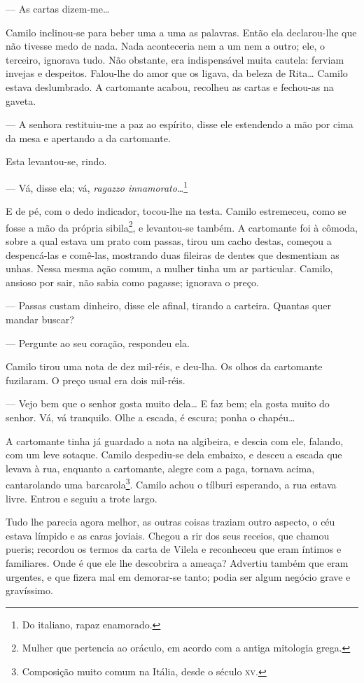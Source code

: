 --- As cartas dizem-me\ldots{}

Camilo inclinou-se para beber uma a uma as palavras. Então ela
declarou-lhe que não tivesse medo de nada. Nada aconteceria nem a um nem
a outro; ele, o terceiro, ignorava tudo. Não obstante, era indispensável
muita cautela: ferviam invejas e despeitos. Falou-lhe do amor que os
ligava, da beleza de Rita\ldots{} Camilo estava deslumbrado. A
cartomante acabou, recolheu as cartas e fechou-as na gaveta.

--- A senhora restituiu-me a paz ao espírito, disse ele estendendo a mão
por cima da mesa e apertando a da cartomante.

Esta levantou-se, rindo.

--- Vá, disse ela; vá, \emph{ragazzo innamorato}\ldots{}\footnote{Do
  italiano, rapaz enamorado.}

E de pé, com o dedo indicador, tocou-lhe na testa. Camilo
estremeceu, como se fosse a mão da própria sibila\footnote{Mulher que
  pertencia ao oráculo, em acordo com a antiga mitologia grega.}, e
levantou-se também. A cartomante foi à cômoda, sobre a qual estava um
prato com passas, tirou um cacho destas, começou a despencá-las e
comê-las, mostrando duas fileiras de dentes que desmentiam as unhas.
Nessa mesma ação comum, a mulher tinha um ar particular. Camilo, ansioso
por sair, não sabia como pagasse; ignorava o preço.

--- Passas custam dinheiro, disse ele afinal, tirando a carteira. Quantas
quer mandar buscar?

--- Pergunte ao seu coração, respondeu ela.

Camilo tirou uma nota de dez mil-réis, e deu-lha. Os olhos da cartomante
fuzilaram. O preço usual era dois mil-réis.

--- Vejo bem que o senhor gosta muito dela\ldots{} E faz bem; ela gosta
muito do senhor. Vá, vá tranquilo. Olhe a escada, é escura; ponha o
chapéu\ldots{}

A cartomante tinha já guardado a nota na algibeira, e descia com ele,
falando, com um leve sotaque. Camilo despediu-se dela embaixo, e desceu
a escada que levava à rua, enquanto a cartomante, alegre com a paga,
tornava acima, cantarolando uma barcarola\footnote{Composição muito
  comum na Itália, desde o século \textsc{xv}.}. Camilo achou
o tílburi esperando, a rua estava livre. Entrou e seguiu a trote largo.

Tudo lhe parecia agora melhor, as outras coisas traziam outro aspecto, o
céu estava límpido e as caras joviais. Chegou a rir dos seus receios,
que chamou pueris; recordou os termos da carta de Vilela e reconheceu
que eram íntimos e familiares. Onde é que ele lhe descobrira a ameaça?
Advertiu também que eram urgentes, e que fizera mal em demorar-se tanto;
podia ser algum negócio grave e gravíssimo.

